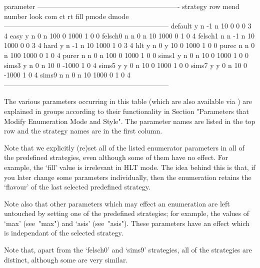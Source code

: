 \begintt
                                   parameter
          -------------------------------------------------------------
strategy  row  mend  number  look  com    ct     rt  fill  pmode  dmode
-----------------------------------------------------------------------
default     y     n      -1     n   10     0      0     0      3      4
easy        y     n       0     n  100     0   1000     1      0      0
felsch0     n     n       0     n   10  1000      0     1      0      4
felsch1     n     n      -1     n   10  1000      0     0      3      4
hard        y     n      -1     n   10  1000      1     0      3      4
hlt         y     n       0     y   10     0   1000     1      0      0
purec       n     n       0     n  100  1000      0     1      0      4
purer       n     n       0     n  100     0   1000     1      0      0
sims1       y     n       0     n   10     0   1000     1      0      0
sims3       y     n       0     n   10     0  -1000     1      0      4
sims5       y     y       0     n   10     0   1000     1      0      0
sims7       y     y       0     n   10     0  -1000     1      0      4
sims9       n     n       0     n   10  1000      0     1      0      4
-----------------------------------------------------------------------
\endtt

The  various  parameters  occurring  in  this table  (which  are  also
available  via {\GAP})  are  explained in  groups  according to  their
functionality in Section "Parameters  that Modify Enumeration Mode and
Style".   The  parameter names  are  listed in  the  top  row and  the
strategy names are in the first column.

Note  that  we  explicitly   (re)set  all  of  the  listed  enumerator
parameters in all of the  predefined strategies, even although some of
them have  no effect. For example,  the `fill' value  is irrelevant in
HLT mode.   The idea  behind this  is that, if  you later  change some
parameters individually, then the enumeration retains the `flavour' of
the  last   selected  predefined  strategy.   

Note also  that other parameters  which may effect an  enumeration are
left  untouched  by setting  one  of  the  predefined strategies;  for
example,  the values  of  `max' (see~"max")  and `asis'  (see~"asis").
These parameters have  an effect which is independant  of the selected
strategy.

Note that, apart from the `felsch0' and `sims9' strategies, all of the
strategies are distinct, although some are very similar.

